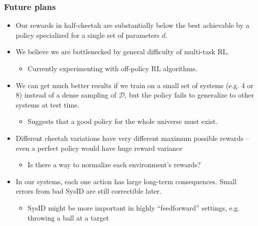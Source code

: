 \documentclass{beamer}
\newcommand{\subitem}[1]{\begin{itemize} \item #1 \end{itemize}}
\newcommand{\cD}{\mathcal{D}}
\begin{document}
\begin{frame}
\frametitle{Future plans}

\begin{itemize}
\item Our rewards in half-cheetah are substantially below the best achievable by a policy specialized for a single set of parameters $d$.
\item We believe we are bottlenecked by general difficulty of multi-task RL.
\subitem{Currently experimenting with off-policy RL algorithms.}
\item We can get much better results if we train on a small set of systems (e.g. 4 or 8) instead of a dense sampling of $\cD$, but the policy fails to generalize to other systems at test time.
\subitem{Suggests that a good policy for the whole universe must exist.}
\item Different cheetah variations have very different maximum possible rewards -- even a perfect policy would have huge reward variance
\subitem{Is there a way to normalize each environment's rewards?}
\item In our systems, each one action has large long-term consequences. Small errors from bad SysID are still correctible later.
\subitem{SysID might be more important in highly ``feedforward'' settings, e.g. throwing a ball at a target}
\end{itemize}
\end{frame}
\end{document}
